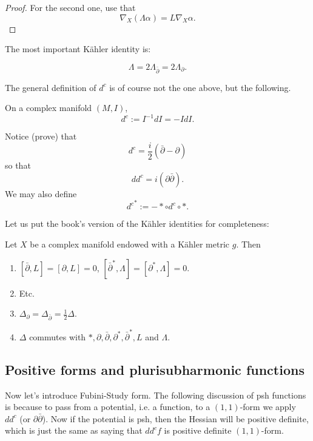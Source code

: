 \begin{proof}
For the second one, use that
$$
\nabla_X (\Lambda\alpha)=L \nabla_X\alpha.
$$

\end{proof}


The most important Kähler identity is:

\begin{theorem}
\label{theorem-kaher-identity}
$$
\Lambda=2 \Lambda_{\bar\partial}
=2\Lambda_{\partial}.
$$
\end{theorem}



\medskip\noindent
The general definition of $d^c$ is
of course not the one above,
but the following.

\begin{definition}
\label{definition-dc}
On a complex manifold $(M,I)$,
$$
d^c:=I^{-1}d I=-I d I.
$$
\end{definition}

Notice (prove) that
$$
d^c=\frac{i}{2}(\bar\partial-\partial)
$$
so that
$$
dd^c=i(\partial \bar\partial).
$$
We may also define
$$
{d^c}^*:=-* \circ d^c \circ *.
$$

\noindent
Let us put the book's version
of the Kähler identities for completeness:

\begin{proposition}
\label{proposition-kahler-identities}
Let $X$ be a complex manifold endowed with a
Kähler metric $g$. Then
\begin{enumerate}
\item $[\bar\partial,L]=[\partial,L]=0$,
$[\bar\partial^*,\Lambda]=[\partial^*,
\Lambda]=0$.
\item  Etc.
\item
$\Delta_\partial=\Delta_{\bar\partial}=
\frac{1}{2}\Delta$.
\item $\Delta$ commutes with
$*,\partial,\bar\partial,\partial^*,
\bar\partial^*,L$
and $\Lambda$.
\end{enumerate}
\end{proposition}



\subsection{Positive forms and
plurisubharmonic
functions}
\label{subsection-positive-forms-psh}

\noindent
Now let's introduce Fubini-Study form.
The following discussion of psh functions is
because
to pass from a potential, i.e. a function,
to a $(1,1)$-form we apply $dd^c$ (or
$\partial\bar\partial$).
Now if the potential is psh,
then the Hessian will be positive definite,
which is just the same as saying that
$dd^cf$ is positive definite $(1,1)$-form.

